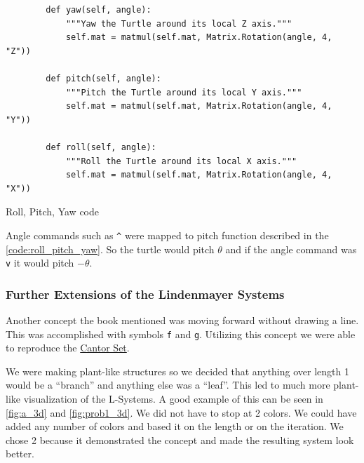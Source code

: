 \begin{listing}[H]
    \begin{verbatim}
        def yaw(self, angle):
            """Yaw the Turtle around its local Z axis."""
            self.mat = matmul(self.mat, Matrix.Rotation(angle, 4, "Z"))

        def pitch(self, angle):
            """Pitch the Turtle around its local Y axis."""
            self.mat = matmul(self.mat, Matrix.Rotation(angle, 4, "Y"))

        def roll(self, angle):
            """Roll the Turtle around its local X axis."""
            self.mat = matmul(self.mat, Matrix.Rotation(angle, 4, "X"))
    \end{verbatim}
    \caption{Roll, Pitch, Yaw code}\label{code:roll_pitch_yaw}
\end{listing}

Angle commands such as \texttt{^} were mapped to pitch function described in
the \autoref{code:roll_pitch_yaw}. So the turtle
would pitch $\theta$ and if the angle command was \texttt{v} it would pitch
$-\theta$.




\subsubsection{Further Extensions of the Lindenmayer Systems}
Another concept the book mentioned was moving forward without drawing a line.
This was accomplished with symbols \texttt{f} and \texttt{g}. Utilizing this
concept we were able to reproduce the
\href{https://sketchfab.com/3d-models/cantor-f645d6ae69a748a283a737f44660c5f6}{Cantor Set}.

We were making plant-like structures so we decided that anything over length 1
would be a ``branch'' and anything else was a ``leaf''. This led to much more
plant-like visualization of the L-Systems. A good example of this can be seen
in \autoref{fig:a_3d} and \autoref{fig:prob1_3d}. We did not have to stop
at 2 colors. We could have added any number of colors and based it on the
length or on the iteration. We chose 2 because it demonstrated the concept and
made the resulting system look better.

